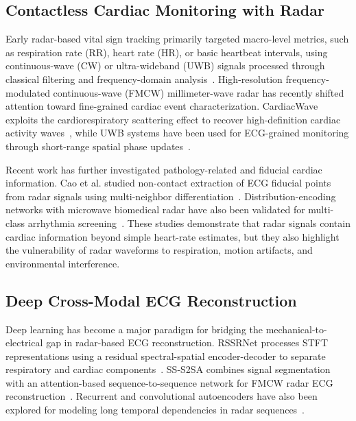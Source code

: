 \documentclass[runningheads]{llncs}
\begin{document}
\subsection{Contactless Cardiac Monitoring with Radar}
Early radar-based vital sign tracking primarily targeted macro-level metrics, such as respiration rate (RR), heart rate (HR), or basic heartbeat intervals, using continuous-wave (CW) or ultra-wideband (UWB) signals processed through classical filtering and frequency-domain analysis~\cite{kimEndtoendElectrocardiogramSignal2024,wangECGgrainedCardiacMonitoring2022c}. High-resolution frequency-modulated continuous-wave (FMCW) millimeter-wave radar has recently shifted attention toward fine-grained cardiac event characterization. CardiacWave exploits the cardiorespiratory scattering effect to recover high-definition cardiac activity waves~\cite{xuCardiacWaveMmWavebasedScheme2021}, while UWB systems have been used for ECG-grained monitoring through short-range spatial phase updates~\cite{wangECGgrainedCardiacMonitoring2022c}.

Recent work has further investigated pathology-related and fiducial cardiac information. Cao et al. studied non-contact extraction of ECG fiducial points from radar signals using multi-neighbor differentiation~\cite{caoNoncontactDetectionElectrocardiogram2024a}. Distribution-encoding networks with microwave biomedical radar have also been validated for multi-class arrhythmia screening~\cite{11398845}. These studies demonstrate that radar signals contain cardiac information beyond simple heart-rate estimates, but they also highlight the vulnerability of radar waveforms to respiration, motion artifacts, and environmental interference.

\subsection{Deep Cross-Modal ECG Reconstruction}
Deep learning has become a major paradigm for bridging the mechanical-to-electrical gap in radar-based ECG reconstruction. RSSRNet processes STFT representations using a residual spectral-spatial encoder-decoder to separate respiratory and cardiac components~\cite{rssrnet}. SS-S2SA combines signal segmentation with an attention-based sequence-to-sequence network for FMCW radar ECG reconstruction~\cite{S2SA}. Recurrent and convolutional autoencoders have also been explored for modeling long temporal dependencies in radar sequences~\cite{li2025non}.
\end{document}
